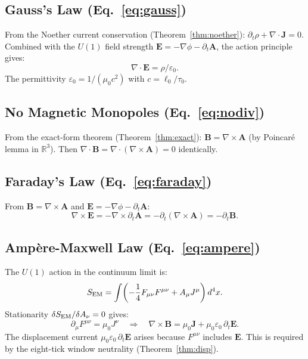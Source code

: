 \documentclass[12pt,a4paper]{article}
\theoremstyle{definition}
\theoremstyle{remark}
\begin{document}
\subsection{Gauss's Law (Eq.~\ref{eq:gauss})}

From the Noether current conservation (Theorem~\ref{thm:noether}):
$\partial_t \rho + \nabla \cdot \mathbf{J} = 0$.
Combined with the $U(1)$ field strength $\mathbf{E} = -\nabla\phi
- \partial_t \mathbf{A}$, the action principle gives:
\begin{equation}
  \nabla \cdot \mathbf{E} = \rho/\varepsilon_0.
\end{equation}
The permittivity $\varepsilon_0 = 1/(\mu_0 c^2)$ with $c = \ell_0/\tau_0$.

\subsection{No Magnetic Monopoles (Eq.~\ref{eq:nodiv})}

From the exact-form theorem (Theorem~\ref{thm:exact}):
$\mathbf{B} = \nabla \times \mathbf{A}$ (by Poincaré lemma in $\mathbb{R}^3$).
Then $\nabla \cdot \mathbf{B} = \nabla \cdot (\nabla \times \mathbf{A}) = 0$
identically.

\subsection{Faraday's Law (Eq.~\ref{eq:faraday})}

From $\mathbf{B} = \nabla \times \mathbf{A}$ and
$\mathbf{E} = -\nabla\phi - \partial_t \mathbf{A}$:
\begin{equation}
  \nabla \times \mathbf{E} = -\nabla \times \partial_t \mathbf{A}
  = -\partial_t (\nabla \times \mathbf{A}) = -\partial_t \mathbf{B}.
\end{equation}

\subsection{Ampère-Maxwell Law (Eq.~\ref{eq:ampere})}

The $U(1)$ action in the continuum limit is:
\begin{equation}
  S_{\rm EM} = \int \!\left(-\frac{1}{4}F_{\mu\nu}F^{\mu\nu}
  + A_\mu J^\mu\right) d^4x.
\end{equation}
Stationarity $\delta S_{\rm EM}/\delta A_\nu = 0$ gives:
\begin{equation}
  \partial_\mu F^{\mu\nu} = \mu_0 J^\nu
  \quad\Rightarrow\quad
  \nabla \times \mathbf{B} = \mu_0 \mathbf{J}
    + \mu_0\varepsilon_0\,\partial_t \mathbf{E}.
\end{equation}
The displacement current $\mu_0\varepsilon_0\,\partial_t\mathbf{E}$ arises
because $F^{\mu\nu}$ includes $\mathbf{E}$.  This is required by the
eight-tick window neutrality (Theorem~\ref{thm:disp}).
\end{document}
